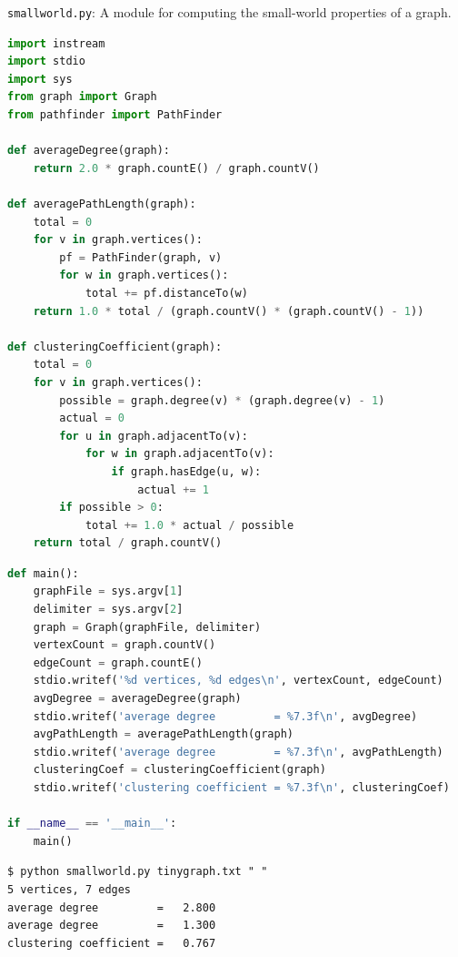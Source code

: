 \documentclass[8pt,a4paper,compress,handout]{beamer}
\begin{document}
\begin{frame}[fragile]
\begin{framed}
\tiny \lstinline{smallworld.py}: A module for computing the small-world properties of a graph.
\end{framed}

\begin{lstlisting}[language=Python]
import instream
import stdio
import sys
from graph import Graph
from pathfinder import PathFinder

def averageDegree(graph):
    return 2.0 * graph.countE() / graph.countV()

def averagePathLength(graph):
    total = 0
    for v in graph.vertices():
        pf = PathFinder(graph, v)
        for w in graph.vertices():
            total += pf.distanceTo(w)
    return 1.0 * total / (graph.countV() * (graph.countV() - 1))

def clusteringCoefficient(graph):
    total = 0
    for v in graph.vertices():
        possible = graph.degree(v) * (graph.degree(v) - 1)
        actual = 0
        for u in graph.adjacentTo(v):
            for w in graph.adjacentTo(v):
                if graph.hasEdge(u, w):
                    actual += 1
        if possible > 0:
            total += 1.0 * actual / possible
    return total / graph.countV()
\end{lstlisting}
\end{frame}

\begin{frame}[fragile]
\begin{lstlisting}[language=Python]
def main():
    graphFile = sys.argv[1]
    delimiter = sys.argv[2]
    graph = Graph(graphFile, delimiter)
    vertexCount = graph.countV()
    edgeCount = graph.countE()
    stdio.writef('%d vertices, %d edges\n', vertexCount, edgeCount)
    avgDegree = averageDegree(graph)
    stdio.writef('average degree         = %7.3f\n', avgDegree)
    avgPathLength = averagePathLength(graph)
    stdio.writef('average degree         = %7.3f\n', avgPathLength)
    clusteringCoef = clusteringCoefficient(graph)
    stdio.writef('clustering coefficient = %7.3f\n', clusteringCoef)

if __name__ == '__main__':
    main()
\end{lstlisting}

\begin{lstlisting}[language={}]
$ python smallworld.py tinygraph.txt " "
5 vertices, 7 edges
average degree         =   2.800
average degree         =   1.300
clustering coefficient =   0.767
\end{lstlisting}
\end{frame}
\end{document}
